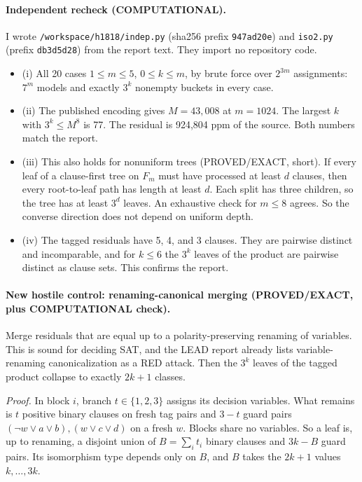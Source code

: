 \documentclass[11pt]{article}
\begin{document}
\paragraph{Independent recheck (COMPUTATIONAL).} I wrote \texttt{/workspace/h1818/indep.py} (sha256 prefix \texttt{947ad20e}) and \texttt{iso2.py} (prefix \texttt{db3d5d28}) from the report text. They import no repository code.
\begin{itemize}
\item (i) All 20 cases $1\le m\le5$, $0\le k\le m$, by brute force over $2^{3m}$ assignments: $7^m$ models and exactly $3^k$ nonempty buckets in every case.
\item (ii) The published encoding gives $M=43{,}008$ at $m=1024$. The largest $k$ with $3^k\le M^8$ is 77. The residual is 924{,}804 ppm of the source. Both numbers match the report.
\item (iii) This also holds for nonuniform trees (PROVED/EXACT, short). If every leaf of a clause-first tree on $F_m$ must have processed at least $d$ clauses, then every root-to-leaf path has length at least $d$. Each split has three children, so the tree has at least $3^d$ leaves. An exhaustive check for $m\le8$ agrees. So the converse direction does not depend on uniform depth.
\item (iv) The tagged residuals have 5, 4, and 3 clauses. They are pairwise distinct and incomparable, and for $k\le6$ the $3^k$ leaves of the product are pairwise distinct as clause sets. This confirms the report.
\end{itemize}

\paragraph{New hostile control: renaming-canonical merging (PROVED/EXACT, plus COMPUTATIONAL check).} Merge residuals that are equal up to a polarity-preserving renaming of variables. This is sound for deciding SAT, and the LEAD report already lists variable-renaming canonicalization as a RED attack. Then the $3^k$ leaves of the tagged product collapse to exactly $2k+1$ classes.

\emph{Proof.} In block $i$, branch $t\in\{1,2,3\}$ assigns its decision variables. What remains is $t$ positive binary clauses on fresh tag pairs and $3-t$ guard pairs $(\neg w\vee a\vee b),(w\vee c\vee d)$ on a fresh $w$. Blocks share no variables. So a leaf is, up to renaming, a disjoint union of $B=\sum_i t_i$ binary clauses and $3k-B$ guard pairs. Its isomorphism type depends only on $B$, and $B$ takes the $2k+1$ values $k,\dots,3k$.
\end{document}
